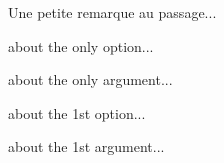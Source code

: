 \documentclass[12pt,a4paper]{scrartcl}
\begin{document}
\begin{remark}
	Une petite remarque au passage...
\end{remark}





\IDoption{} about the only option...

\IDarg{} about the only argument...

 about the 1st option...

 about the 1st argument...
\end{document}
